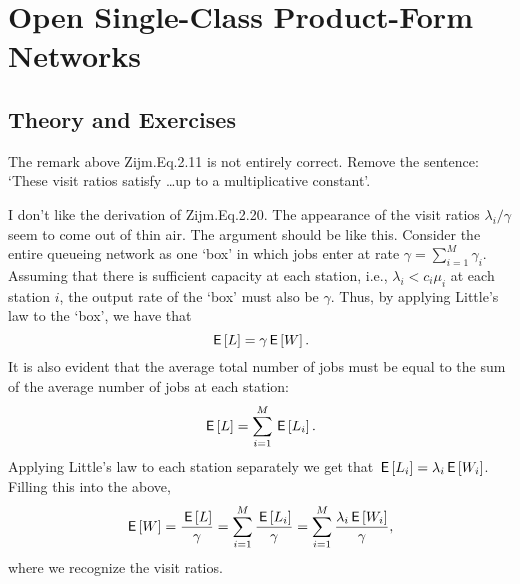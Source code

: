 \section{Open Single-Class Product-Form Networks}
\label{sec:jackson-networks}


\subsection*{Theory and Exercises}


The remark above Zijm.Eq.2.11 is not entirely correct. Remove the
sentence: `These visit ratios satisfy \ldots up to a multiplicative
constant'.


I don't like the derivation of Zijm.Eq.2.20. The appearance of the
visit ratios $\lambda_i/\gamma$ seem to come out of thin air. The
argument should be like this. Consider the entire queueing network as
one `box' in which jobs enter at rate $\gamma=\sum_{i=1}^M
\gamma_i$.
Assuming that there is sufficient capacity at each station, i.e.,
$\lambda_i < c_i \mu_i$ at each station $i$, the output rate of the `box' must also be $\gamma$. Thus, by applying Little's law to the `box', we have that 
\begin{equation*}
  \,\mathsf{E}\left[L\right] = \gamma \,\mathsf{E}\left[W\right]. 
\end{equation*}
It is also evident that the average total number of jobs must be equal
to the sum of the average number of  jobs at each station: 
\begin{equation*}
  \,\mathsf{E}\left[L\right] = \sum_{i=1}^M \,\mathsf{E}\left[L_i\right].
\end{equation*}
Applying Little's law to each station separately we get that
$\,\mathsf{E}\left[L_i\right] = \lambda_i\,\mathsf{E}\left[W_i\right]$. Filling this into the above,
\begin{equation*}
\,\mathsf{E}\left[W\right] = \frac{\,\mathsf{E}\left[L\right]}{\gamma}  = \sum_{i=1}^M \frac{\,\mathsf{E}\left[L_i\right]}\gamma = \sum_{i=1}^M \frac{\lambda_i \,\mathsf{E}\left[ W_i\right]}\gamma, 
\end{equation*}
where we recognize the visit ratios.




\begin{comment}
\begin{exercise}[use=false]
  Use the ideas of Zijm.Eq.2.2 to set up a set of balance equations
  for a single-server queueing station with two queues such that queue
  1 is served with strict priority over queue 2, and service of a job
  of type 2 is preemptive. Assume that type i jobs arrive at rate
  $\lambda_i$ and require average service time
  $\mu_i^{-1}$. Inter-arrival times of jobs each type are exponentially distributed,
  just as the service times.

  Can you find similar equations for the case with multiple servers at
  the station, all serving type 1 jobs with strict priority over type
  2 jobs?
  \begin{solution}
    TBD.
  \end{solution}
\end{exercise}
  
\end{comment}

